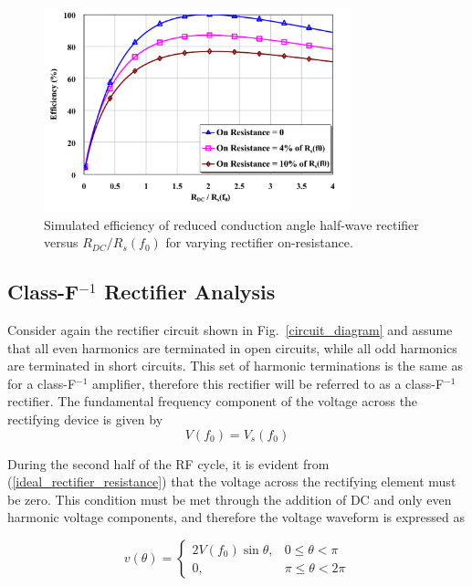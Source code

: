 \begin{figure}
  \begin{center}
  \includegraphics[width=3.5in]{pdf/03.pdf}
  \caption{Simulated efficiency of reduced conduction angle half-wave rectifier versus $R_{DC} / R_s(f_0)$ for varying rectifier on-resistance.}\label{sim_opt_eff}
  \end{center}
\end{figure}










\subsection {Class-F$^{-1}$ Rectifier Analysis}

Consider again the rectifier circuit shown in Fig.~\ref{circuit_diagram} and assume that all even harmonics are terminated in open circuits, while all odd harmonics are terminated in short circuits. This set of harmonic terminations is the same as for a class-F$^{-1}$ amplifier, therefore this rectifier will be referred to as a class-F$^{-1}$ rectifier. The fundamental frequency component of the voltage across the rectifying device is given by
\begin{equation}\label{fundamental_diode_voltage}
    V(f_0) = V_s(f_0)
\end{equation}

During the second half of the RF cycle, it is evident from (\ref{ideal_rectifier_resistance}) that the voltage across the rectifying element must be zero.  This condition must be met through the addition of DC and only even harmonic voltage components, and therefore the voltage waveform is expressed as

\begin{equation}\label{diode_voltage_waveform_finv}
v(\theta) =
\begin{cases}
    2V(f_0)\sin\theta, & 0 \leq \theta < \pi\\
    0, & \pi \leq \theta < 2\pi
\end{cases}
\end{equation}


